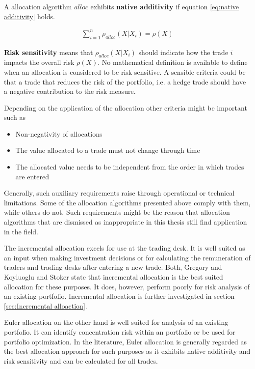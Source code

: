 \documentclass[../Thesis_AHoecherl.tex]{subfiles}
\begin{document}
A allocation algorithm $alloc$ exhibits \textbf{native additivity} if equation \ref{eq:native additivity} holds.

\begin{align}
    \sum_{i=1}^n{\rho_{alloc}\left(X|X_i\right)} = \rho\left(X\right)
    \label{eq:native additivity}
\end{align}

\textbf{Risk sensitivity} means that $\rho_{alloc}\left(X|X_i\right)$ should indicate how the trade $i$ impacts the overall risk $\rho\left(X\right)$. 
No mathematical definition is available to define when an allocation is considered to be risk sensitive. A sensible criteria could be that a trade that reduces the risk of the portfolio, i.e. a hedge trade should have a negative contribution to the risk measure.

Depending on the application of the allocation other criteria might be important such as
\begin{itemize}
    \item Non-negativity of allocations
    \item The value allocated to a trade must not change through time
    \item The allocated value needs to be independent from the order in which trades are entered 
\end{itemize}
Generally, such auxiliary requirements raise through operational or technical limitations. Some of the allocation algorithms presented above comply with them, while others do not. 
Such requirements might be the reason that allocation algorithms that are dismissed as inappropriate in this thesis still find application in the field.

The incremental allocation excels for use at the trading desk. It is well suited as an input when making investment decisions or for calculating the remuneration of traders and trading desks after entering a new trade.
Both, Gregory \cite{gregory2015xva} and Koyluoglu and Stoker \cite{koyluoglu2002risk} state that incremental allocation is the best suited allocation for these purposes. It does, however, perform poorly for risk analysis of an existing portfolio. Incremental allocation is further investigated in section \ref{sec:Incremental alloaction}.

Euler allocation on the other hand is well suited for analysis of an existing portfolio. It can identify concentration risk within an portfolio or be used for portfolio optimization. 
In the literature, Euler allocation is generally regarded as the best allocation approach for such purposes as it exhibits native additivity and risk sensitivity and can be calculated for all trades.
\end{document}
